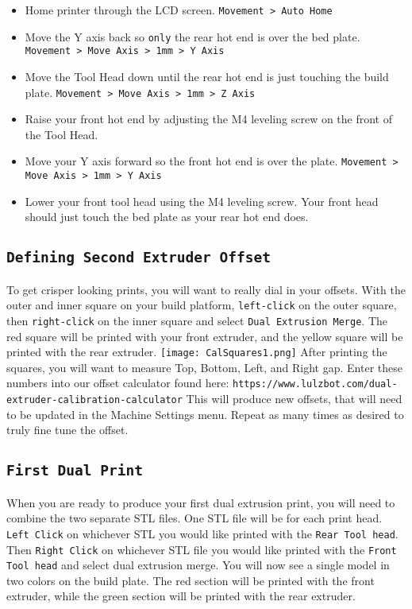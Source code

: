 \begin{itemize}
\item Home printer through the LCD screen. \texttt{Movement > Auto Home}
\item Move the Y axis back so \texttt{only} the rear hot end is over the bed plate. \texttt{Movement > Move Axis > 1mm > Y Axis}
\item Move the Tool Head down until the rear hot end is just touching the build plate. \texttt{Movement > Move Axis > 1mm > Z Axis}
\item Raise your front hot end by adjusting the M4 leveling screw on the front of the Tool Head.
\item Move your Y axis forward so the front hot end is over the plate. \texttt{Movement > Move Axis > 1mm > Y Axis}
\item Lower your front tool head using the M4 leveling screw. Your front head should just touch the bed plate as your rear hot end does.
\end{itemize}

\subsection{\texttt{Defining Second Extruder Offset}}
To get crisper looking prints, you will want to really dial in your offsets. With the outer and inner square on your build platform, \texttt{left-click} on the outer square, then \texttt{right-click} on the inner square and select \texttt{Dual Extrusion Merge}. The red square will be printed with your front extruder, and the yellow square will be printed with the rear extruder.
\texttt{[image: CalSquares1.png]}
After printing the squares, you will want to measure Top, Bottom, Left, and Right gap. Enter these numbers into our offset calculator found here: \texttt{https://www.lulzbot.com/dual-extruder-calibration-calculator} This will produce new offsets, that will need to be updated in the Machine Settings menu. Repeat as many times as desired to truly fine tune the offset. 

\subsection{\texttt{First Dual Print}}
When you are ready to produce your first dual extrusion print, you will need to combine the two separate STL files. One STL file will be for each print head. \texttt{Left Click} on whichever STL you would like printed with the \texttt{Rear Tool head}. Then \texttt{Right Click} on whichever STL file you would like printed with the \texttt{Front Tool head} and select dual extrusion merge. You will now see a single model in two colors on the build plate. The red section will be printed with the front extruder, while the green section will be printed with the rear extruder. 

